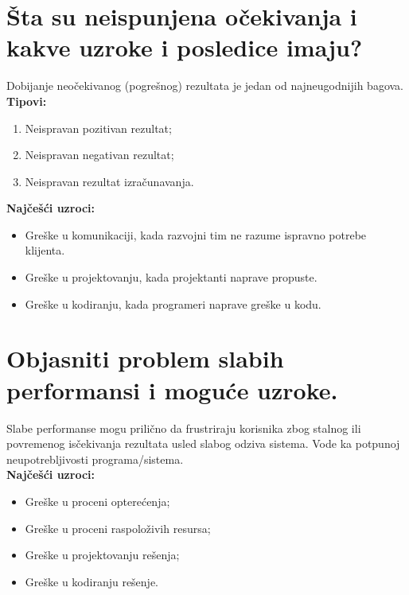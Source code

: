 \documentclass[a4paper]{article}
\begin{document}
\section{Šta su neispunjena očekivanja i kakve uzroke i posledice imaju?}
  Dobijanje neočekivanog (pogrešnog) rezultata je jedan od najneugodnijih bagova. \\
  \textbf{Tipovi:}
  \begin{enumerate}
    \item Neispravan pozitivan rezultat;
    \item Neispravan negativan rezultat;
    \item Neispravan rezultat izračunavanja.
  \end{enumerate}
  \textbf{Najčešći uzroci:}
  \begin{itemize}
    \item Greške u komunikaciji, kada razvojni tim ne razume ispravno potrebe klijenta.
    \item Greške u projektovanju, kada projektanti naprave propuste.
    \item Greške u kodiranju, kada programeri naprave greške u kodu.
  \end{itemize}

\section{Objasniti problem slabih performansi i moguće uzroke.}
  Slabe performanse mogu prilično da frustriraju korisnika zbog stalnog ili povremenog isčekivanja
  rezultata usled slabog odziva sistema. Vode ka potpunoj neupotrebljivosti programa/sistema.\\
  \textbf{Najčešći uzroci:}
  \begin{itemize}
    \item Greške u proceni opterećenja;
    \item Greške u proceni raspoloživih resursa;
    \item Greške u projektovanju rešenja;
    \item Greške u kodiranju rešenje.
  \end{itemize}
\end{document}
